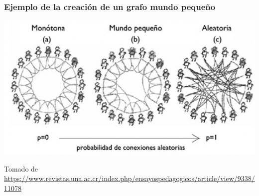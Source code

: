 \documentclass[
10pt, %
aspectratio=169, %
]{beamer}
\begin{document}
		
	
	\begin{frame}
		
		\frametitle{Ejemplo de la creación de un grafo mundo pequeño}
		
		\centering
		\includegraphics[scale=0.4]{mundo-pequenno.png}
		
		{\scriptsize Tomado de 	\url{https://www.revistas.una.ac.cr/index.php/ensayospedagogicos/article/view/9338/11078}}
	
	\end{frame}
	
\end{document}
